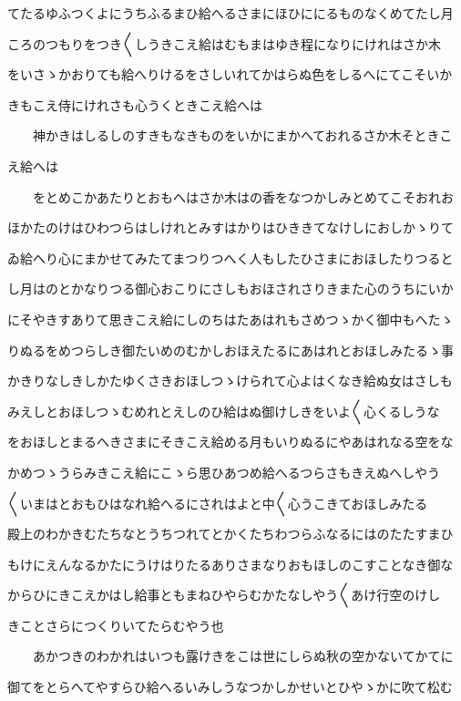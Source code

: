 \documentclass[a4paper,11pt,landscape]{ltjtarticle}
\begin{document}
てたるゆふつくよにうちふるまひ給へるさまにほひににるものなくめてたし月
\par\medskip
ころのつもりをつき〱しうきこえ給はむもまはゆき程になりにけれはさか木
\par\medskip
をいさゝかおりても給へりけるをさしいれてかはらぬ色をしるへにてこそいか
\par\medskip
きもこえ侍にけれさも心うくときこえ給へは
\par\medskip
　　神かきはしるしのすきもなきものをいかにまかへておれるさか木そときこ
\par\medskip
え給へは
\par\medskip
　　をとめこかあたりとおもへはさか木はの香をなつかしみとめてこそおれお
\par\medskip
ほかたのけはひわつらはしけれとみすはかりはひききてなけしにおしかゝりて
\par\medskip
ゐ給へり心にまかせてみたてまつりつへく人もしたひさまにおほしたりつると
\par\medskip
し月はのとかなりつる御心おこりにさしもおほされさりきまた心のうちにいか
\par\medskip
にそやきすありて思きこえ給にしのちはたあはれもさめつゝかく御中もへたゝ
\par\medskip
りぬるをめつらしき御たいめのむかしおほえたるにあはれとおほしみたるゝ事
\par\medskip
かきりなしきしかたゆくさきおほしつゝけられて心よはくなき給ぬ女はさしも
\par\medskip
みえしとおほしつゝむめれとえしのひ給はぬ御けしきをいよ〱心くるしうな
\par\medskip
をおほしとまるへきさまにそきこえ給める月もいりぬるにやあはれなる空をな
\par\medskip
かめつゝうらみきこえ給にこゝら思ひあつめ給へるつらさもきえぬへしやう
\par\medskip
〱いまはとおもひはなれ給へるにされはよと中〱心うこきておほしみたる
\par\medskip
殿上のわかきむたちなとうちつれてとかくたちわつらふなるにはのたたすまひ
\par\medskip
もけにえんなるかたにうけはりたるありさまなりおもほしのこすことなき御な
\par\medskip
からひにきこえかはし給事ともまねひやらむかたなしやう〱あけ行空のけし
\par\medskip
きことさらにつくりいてたらむやう也
\par\medskip
　　あかつきのわかれはいつも露けきをこは世にしらぬ秋の空かないてかてに
\par\medskip
御てをとらへてやすらひ給へるいみしうなつかしかせいとひやゝかに吹て松む
\end{document}
